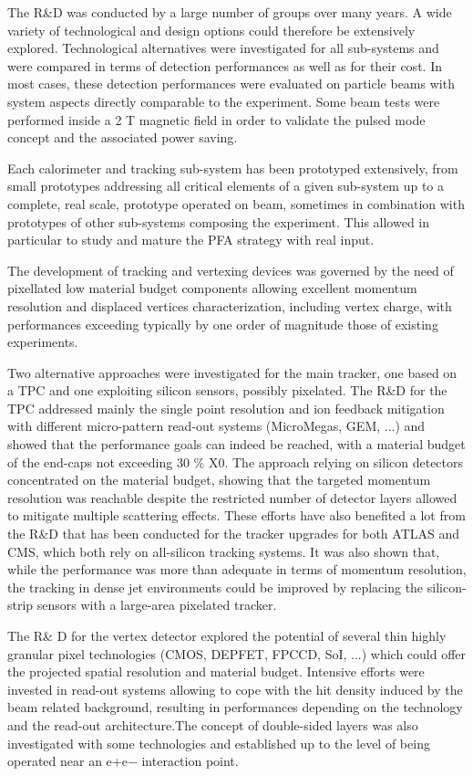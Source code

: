 \documentclass[%
 reprint,
 amsmath,amssymb,
 aps,
]{revtex4-1}
\begin{document}
The R\&D was conducted by a large number of groups over many years. A wide variety of technological and design options could therefore be extensively explored. Technological alternatives were investigated for all sub-systems and were compared in terms of detection performances as well as for their cost. In most cases, these detection performances were evaluated on particle beams with system aspects directly comparable to the experiment. Some beam tests were performed inside a 2 T magnetic ﬁeld in order to validate the pulsed mode concept and the associated power saving.

Each calorimeter and tracking sub-system has been prototyped extensively, from small prototypes addressing all critical elements of a given sub-system up to a complete, real scale, prototype operated on beam, sometimes in combination with prototypes of other sub-systems composing the experiment. This allowed in particular to study and mature the PFA strategy with real input.

The development of tracking and vertexing devices was governed by the need of pixellated low material budget components allowing excellent momentum resolution and displaced vertices characterization, including vertex charge, with performances exceeding typically by one order of magnitude those of existing experiments.

Two alternative approaches were investigated for the main tracker, one based on a TPC and one exploiting silicon sensors, possibly pixelated. The R\&D for the TPC addressed mainly the single point resolution and ion feedback mitigation with diﬀerent micro-pattern read-out systems (MicroMegas, GEM, ...) and showed that the performance goals can indeed be reached, with a material budget of the end-caps not exceeding 30 \% X0. The approach relying on silicon detectors concentrated on the material budget, showing that the targeted momentum resolution was reachable despite the restricted number of detector layers allowed to mitigate multiple scattering eﬀects. These efforts have also benefited a lot from the R\&D that has been conducted for the tracker upgrades for both ATLAS and CMS, which both rely on all-silicon tracking systems.
It was also shown that, while the performance was more than adequate in terms of momentum resolution, the tracking in dense jet environments could be improved by replacing the silicon-strip sensors with a large-area pixelated tracker. 

The R\& D for the vertex detector explored the potential of several thin highly granular pixel technologies (CMOS, DEPFET, FPCCD, SoI, ...) which could oﬀer the projected spatial resolution and material budget. Intensive eﬀorts were invested in read-out systems allowing to cope with the hit density induced by the beam related background, resulting in performances depending on the technology and the read-out architecture.The concept of double-sided layers was also investigated with some technologies and established up to the level of being operated near an e+e− interaction point.
\end{document}

